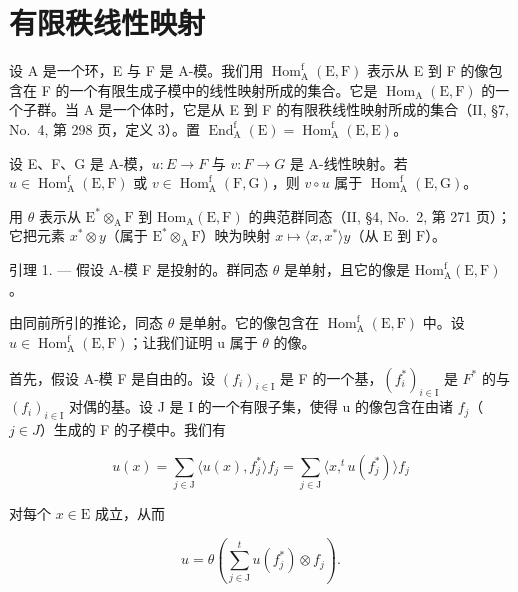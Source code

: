 \section{有限秩线性映射}

设 A 是一个环，E 与 F 是 A-模。我们用 \(\operatorname{Hom}_{\mathrm{A}}^{\mathrm{f}}(\mathrm{E},\mathrm{F})\) 表示从 E 到 F 的像包含在 F 的一个有限生成子模中的线性映射所成的集合。它是 \(\operatorname{Hom}_{\mathrm{A}}(\mathrm{E},\mathrm{F})\) 的一个子群。当 A 是一个体时，它是从 E 到 F 的有限秩线性映射所成的集合（II, §7, No.~4, 第 298 页，定义 3）。置 \(\operatorname{End}_{\mathrm{A}}^{\mathrm{f}}(\mathrm{E}) = \operatorname{Hom}_{\mathrm{A}}^{\mathrm{f}}(\mathrm{E},\mathrm{E})\)。

设 E、F、G 是 A-模，\(u : E \to F\) 与 \(v : F \to G\) 是 A-线性映射。若 \(u \in \operatorname{Hom}_{\mathrm{A}}^{\mathrm{f}}(\mathrm{E}, \mathrm{F})\) 或 \(v \in \operatorname{Hom}_{\mathrm{A}}^{\mathrm{f}}(\mathrm{F}, \mathrm{G})\)，则 \(v \circ u\) 属于 \(\operatorname{Hom}_{\mathrm{A}}^{\mathrm{f}}(\mathrm{E}, \mathrm{G})\)。

用 \(\theta\) 表示从 \(\mathrm{E}^* \otimes_{\mathrm{A}} \mathrm{F}\) 到 \(\mathrm{Hom}_{\mathrm{A}}(\mathrm{E}, \mathrm{F})\) 的典范群同态（II, §4, No.~2, 第 271 页）；它把元素 \(x^* \otimes y\)（属于 \(\mathrm{E}^* \otimes_{\mathrm{A}} \mathrm{F}\)）映为映射 \(x \mapsto \langle x, x^* \rangle y\)（从 \(\mathrm{E}\) 到 \(\mathrm{F}\)）。

引理 1. --- 假设 A-模 F 是投射的。群同态 \(\theta\) 是单射，且它的像是 \(\mathrm{Hom}_{\mathrm{A}}^{\mathrm{f}}(\mathrm{E},\mathrm{F})\)。

由同前所引的推论，同态 \(\theta\) 是单射。它的像包含在 \(\operatorname{Hom}_{\mathrm{A}}^{\mathrm{f}}(\mathrm{E},\mathrm{F})\) 中。设 \(u \in \operatorname{Hom}_{\mathrm{A}}^{\mathrm{f}}(\mathrm{E},\mathrm{F})\)；让我们证明 u 属于 \(\theta\) 的像。

首先，假设 A-模 F 是自由的。设 \((f_{i})_{i\in\mathrm{I}}\) 是 F 的一个基，\((f_{i}^{*})_{i\in\mathrm{I}}\) 是 \(F^{*}\) 的与 \((f_{i})_{i\in\mathrm{I}}\) 对偶的基。设 J 是 I 的一个有限子集，使得 u 的像包含在由诸 \(f_{j}\)（\(j\in J\)）生成的 F 的子模中。我们有

\[
u (x) = \sum_ {j \in \mathrm{J}} \langle u (x), f _ {j} ^ {*} \rangle f _ {j} = \sum_ {j \in \mathrm{J}} \langle x, ^ {t} u (f _ {j} ^ {*}) \rangle f _ {j}\tag{1}
\]

对每个 \(x\in \mathrm{E}\) 成立，从而

\[
u = \theta \left(\sum_ {j \in \mathrm{J}} ^ {t} u \left(f _ {j} ^ {*}\right) \otimes f _ {j}\right).\tag{2}
\]

